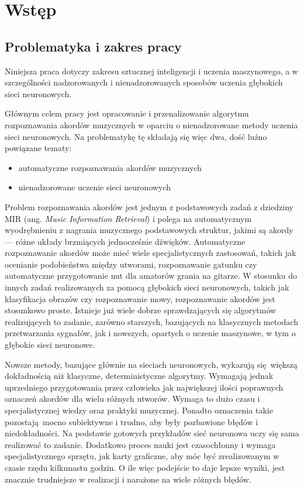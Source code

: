 \chapter{Wstęp} \label{chapter:introduction}



\section{Problematyka i zakres pracy}

Niniejsza praca dotyczy zakresu sztucznej inteligencji i uczenia maszynowego, a w szczególności nadzorowanych i nienadzorowanych sposobów uczenia głębokich sieci neuronowych.

Głównym celem pracy jest opracowanie i przenalizowanie algorytmu rozpoznawania akordów muzycznych w oparciu o nienadzorowane metody uczenia sieci neuronowych. Na problematykę tę składają się więc dwa, dość luźno powiązane tematy:
\begin{itemize}
    \item automatyczne rozpoznawania akordów muzycznych
    \item nienadzorowane uczenie sieci neuronowych
\end{itemize}

Problem rozpoznawania akordów jest jednym z podstawowych zadań z dziedziny MIR (ang. \emph{Music Information Retrieval}) i polega na automatycznym wyodrębnieniu z nagrania muzycznego podstawowych struktur, jakimi są akordy --- różne układy brzmiących jednocześnie dźwięków. Automatyczne rozpoznawanie akordów może mieć wiele specjalistycznych zastosowań, takich jak ocenianie podobieństwa między utworami, rozpoznawanie gatunku czy automatyczne przygotowanie nut dla amatorów grania na gitarze. W stosunku do innych zadań realizowanych za pomocą głębokich sieci neuronowych, takich jak klasyfikacja obrazów czy rozpoznawanie mowy, rozpoznawanie akordów jest stosunkowo proste. Istnieje już wiele dobrze sprawdzających się algorytmów realizujących to zadanie, zarówno starszych, bazujących na klasycznych metodach przetwarzania sygnałów, jak i nowszych, opartych o uczenie maszynowe, w tym o głębokie sieci neuronowe. 

Nowsze metody, bazujące głównie na sieciach neuronowych, wykazują się większą dokładnością niż klasyczne, deterministyczne algorytmy. Wymagają jednak uprzedniego przygotowania przez człowieka jak największej ilości poprawnych oznaczeń akordów dla wielu różnych utworów. Wymaga to dużo czasu i specjalistycznej wiedzy oraz praktyki muzycznej. Ponadto oznaczenia takie pozostają mocno subiektywne i trudno, aby były pozbawione błędów i niedokładności.  Na podstawie gotowych przykładów sieć neuronowa uczy się sama realizować to zadanie. Dodatkowo proces nauki jest czasochłonny i wymaga specjalistycznego sprzętu, jak karty graficzne, aby móc być zrealizowanym w czasie rzędu kilkunastu godzin. O ile więc podejście to daje lepsze wyniki, jest znacznie trudniejsze w realizacji i narażone na wiele różnych błędów.

